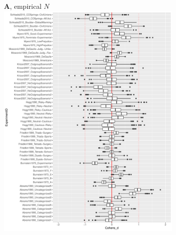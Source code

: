 \documentclass[
  abstract]{article}
\begin{document}
\begin{figure}
  \caption{
    Boxplots visualizing the distribution of Cohen's $d$ values (x-axis in
    A and B) inferred through a metric linear model over 1000 simulation 
    trials for each experimental condition (y-axis in A and B). All conditions
    have many trials that result in non-zero Cohen's $d$ values with number of
    simulated participants, $N$, set to their empirical values reported in the
    associated journal article (A). However, when the number of simulated
    participants is increased to $10N$, there are several conditions that 
    indeed yield distributions closer to $d = 0$ as expected, however some
    conditions have $d$ distributions centered on a nonzero mean with little to
    no overlap with $d=0$; variance in $d$ decreases as expected
    across experimental conditions (B).
  }  
  \label{fig:MetricBoxplots}
  \centering
  \begin{subfigure}[]{0.9\textwidth}
    \centering
    \textsf{\large \textbf{A}, empirical $N$} \\
    \includegraphics[width=\textwidth]{Figures/boxplots/metric_cohens.pdf}
    \label{fig:MetricBoxplot_N}
  \end{subfigure} \\
\end{figure}
\end{document}
